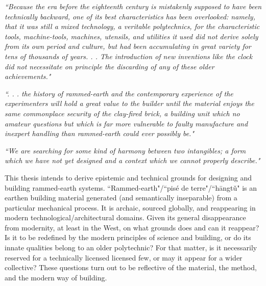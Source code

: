 \begin{flushright}
\small{
\textit{
``Because the era before the eighteenth century is mistakenly supposed to have been technically backward, one of its best characteristics has been overlooked: namely, that it was still a mixed technology, a veritable polytechnics, for the characteristic tools, machine-tools, machines, utensils, and utilities it used did not derive solely from its own period and culture, but had been accumulating in great variety for tens of thousands of years. . . The introduction of new inventions like the clock did not necessitate on principle the discarding of any of these older achievements." \cite[p.134]{MYTHMACHINE}}}
\end{flushright}

\begin{flushright}
  \small{
  \textit{``. . . the history of rammed-earth and the contemporary
experience of the experimenters will hold a great value to
the builder until the material enjoys the same commonplace
security of the clay-fired brick, a building unit which no
amateur questions but which is far more vulnerable to
faulty manufacture and inexpert handling than rammed-earth
could ever possibly be." \cite[p.xvi]{RAMMEDEARTHHOUSE}}}
\end{flushright}

\begin{flushright}
  \small{
  \textit{``We are searching for some kind of harmony between two intangibles; a form which we have not yet designed and a context which we cannot properly describe." \cite[p.xvi]{RAMMEDEARTHHOUSE}}}
\end{flushright}

This thesis intends to derive epistemic and technical grounds for designing and building rammed-earth systems. ``Rammed-earth"/``pis\'e de terre"/``h\=angt\v u" is an earthen building material generated (and semantically inseparable) from a particular mechanical process. It is archaic, sourced globally, and reappearing in modern technological/architectural domains. Given its general disappearance from modernity, at least in the West, on what grounds does and can it reappear? Is it to be redefined by the modern principles of science and building, or do its innate qualities belong to an older polytechnic? For that matter, is it necessarily reserved for a technically licensed licensed few, or may it appear for a wider collective? These questions turn out to be reflective of the material, the method, and the modern way of building.

